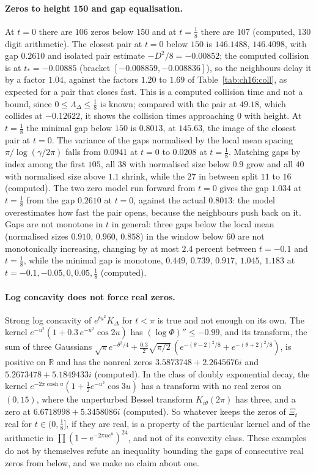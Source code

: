 \paragraph{Zeros to height 150 and gap equalisation.} At $t=0$ there are $106$ zeros below $150$ and at $t=\frac18$ there are $107$ (computed, $130$ digit arithmetic). The closest pair at $t=0$ below $150$ is $146.1488$, $146.4098$, with gap $0.2610$ and isolated pair estimate $-D^2/8=-0.00852$; the computed collision is at $t_*=-0.00885$ (bracket $[-0.008859,-0.008836]$), so the neighbours delay it by a factor $1.04$, against the factors $1.20$ to $1.69$ of Table~\ref{tab:ch16:coll}, as expected for a pair that closes fast. This is a computed collision time and not a bound, since $0\le\Lambda_\Delta\le\frac18$ is known; compared with the pair at $49.18$, which collides at $-0.12622$, it shows the collision times approaching $0$ with height. At $t=\frac18$ the minimal gap below $150$ is $0.8013$, at $145.63$, the image of the closest pair at $t=0$. The variance of the gaps normalised by the local mean spacing $\pi/\log(\gamma/2\pi)$ falls from $0.0941$ at $t=0$ to $0.0208$ at $t=\frac18$. Matching gaps by index among the first $105$, all $38$ with normalised size below $0.9$ grow and all $40$ with normalised size above $1.1$ shrink, while the $27$ in between split $11$ to $16$ (computed). The two zero model run forward from $t=0$ gives the gap $1.034$ at $t=\frac18$ from the gap $0.2610$ at $t=0$, against the actual $0.8013$: the model overestimates how fast the pair opens, because the neighbours push back on it. Gaps are not monotone in $t$ in general: three gaps below the local mean (normalised sizes $0.910$, $0.960$, $0.858$) in the window below $60$ are not monotonically increasing, changing by at most $2.4$ percent between $t=-0.1$ and $t=\frac18$, while the minimal gap is monotone, $0.449$, $0.739$, $0.917$, $1.045$, $1.183$ at $t=-0.1,-0.05,0,0.05,\frac18$ (computed).

\paragraph{Log concavity does not force real zeros.} Strong log concavity of $e^{tu^2}K_\Delta$ for $t<\pi$ is true and not enough on its own. The kernel $e^{-u^2}(1+0.3\,e^{-u^2}\cos2u)$ has $(\log\Phi)''\le-0.99$, and its transform, the sum of three Gaussians $\sqrt\pi e^{-\theta^2/4}+\frac{0.3}2\sqrt{\pi/2}\,(e^{-(\theta-2)^2/8}+e^{-(\theta+2)^2/8})$, is positive on $\mathbb R$ and has the nonreal zeros $3.5873748+2.2645676i$ and $5.2673478+5.1849433i$ (computed). In the class of doubly exponential decay, the kernel $e^{-2\pi\cosh u}(1+\frac12e^{-u^2}\cos3u)$ has a transform with no real zeros on $(0,15)$, where the unperturbed Bessel transform $K_{i\theta}(2\pi)$ has three, and a zero at $6.6718998+5.3458086i$ (computed). So whatever keeps the zeros of $\Xi_t$ real for $t\in(0,\frac18]$, if they are real, is a property of the particular kernel and of the arithmetic in $\prod(1-e^{-2\pi ne^u})^{24}$, and not of its convexity class. These examples do not by themselves refute an inequality bounding the gaps of consecutive real zeros from below, and we make no claim about one.

